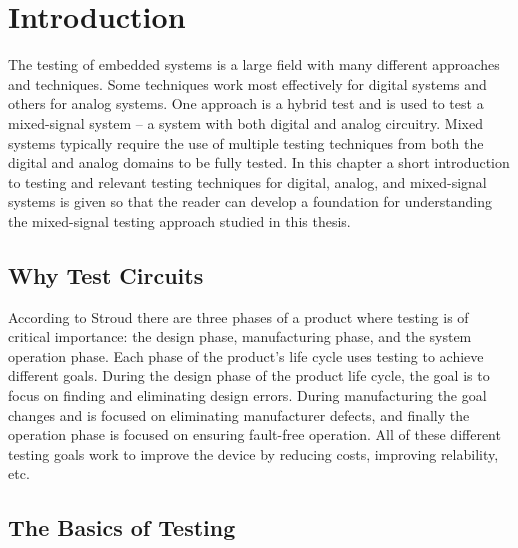 \documentclass[12pt]{report}
\begin{document}
\normalem       %


\chapter{Introduction}  %

The testing of embedded systems is a large field with many different approaches and techniques.  Some techniques work most effectively for digital systems and others for analog systems.  One approach is a hybrid test and is used to test a mixed-signal system -- a system with both digital and analog circuitry.  Mixed systems typically require the use of multiple testing techniques from both the digital and analog domains to be fully tested.  In this chapter a short introduction to testing and relevant testing techniques for digital, analog, and mixed-signal systems is given so that the reader can develop a foundation for understanding the mixed-signal testing approach studied in this thesis. 

\section{Why Test Circuits}
\label{sct:whytest}
According to Stroud\cite{stroud} there are three phases of a product where testing is of critical importance: the design phase, manufacturing phase, and the system operation phase.  Each phase of the product's life cycle uses testing to achieve different goals.  During the design phase of the product life cycle, the goal is to focus on finding and eliminating design errors.  During manufacturing the goal changes and is focused on eliminating manufacturer defects, and finally the operation phase is focused on ensuring fault-free operation.  All of these different testing goals work to improve the device by reducing costs, improving relability, etc.  

\section{The Basics of Testing}
\label{sct:basictesting}
\end{document}
